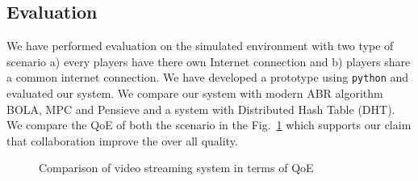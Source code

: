 \subsection{Evaluation}
We have performed evaluation on the simulated environment with two type of scenario a) every players have there own Internet connection and b) players share a common internet connection. We have developed a prototype using {\tt python} and evaluated our system. We compare our system with modern ABR algorithm BOLA, MPC and Pensieve and a system with Distributed Hash Table (DHT). We compare the QoE of both the scenario in the Fig.~\ref{fig:FLiDASH:QoE} which supports our claim that collaboration improve the over all quality.
\begin{figure}[h]
	\captionsetup[subfigure]{width=0.49\linewidth}
	\begin{center}
	\end{center}
	\caption{\label{fig:FLiDASH:QoE}Comparison of video streaming system in terms of QoE}
\end{figure}
